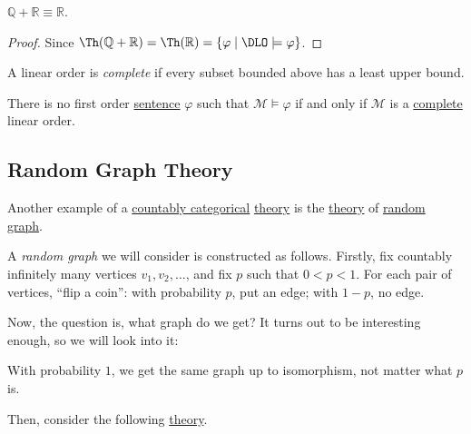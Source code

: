\begin{corollary}
	\(\mathbb{Q} + \mathbb{R} \equiv \mathbb{R} \).
\end{corollary}
\begin{proof}
	Since \(\Th(\mathbb{Q} + \mathbb{R} ) = \Th(\mathbb{R} ) = \left\{ \varphi \mid \DLO \models \varphi \right\}\).
\end{proof}

\begin{definition}[Complete]\label{def:linear-order-complete}
	A linear order is \emph{complete} if every subset bounded above has a least upper bound.
\end{definition}

\begin{corollary}
	There is no first order \hyperref[def:sentence]{sentence} \(\varphi \) such that \(\mathcal{M} \models \varphi \) if and only if \(\mathcal{M} \) is a \hyperref[def:linear-order-complete]{complete} linear order.
\end{corollary}

\subsection{Random Graph Theory}
Another example of a \hyperref[def:countably-categorical]{countably categorical} \hyperref[def:theory]{theory} is the \hyperref[def:theory]{theory} of \hyperref[def:random-graph]{random graph}.

\begin{definition}\label{def:random-graph}
	A \emph{random graph} we will consider is constructed as follows. Firstly, fix countably infinitely many vertices \(v_1, v_2, \dots \), and fix \(p\) such that \(0 < p < 1\). For each pair of vertices, ``flip a coin'': with probability \(p\), put an edge; with \(1-p\), no edge.
\end{definition}

Now, the question is, what graph do we get? It turns out to be interesting enough, so we will look into it:

\begin{remark}
	With probability \(1\), we get the same graph up to isomorphism, not matter what \(p\) is.
\end{remark}

Then, consider the following \hyperref[def:theory]{theory}.

